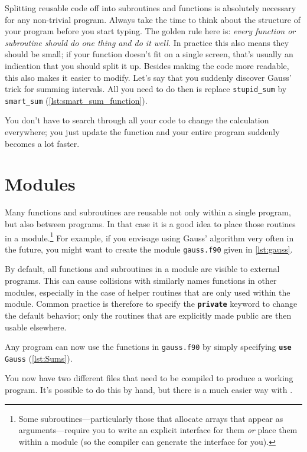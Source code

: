 \documentclass[openany,oneside]{report}
\newcommand{\keyword}[1]{\texttt{\bfseries\color{DarkRed}#1}}
\begin{document}
Splitting reusable code off into subroutines and functions is absolutely necessary for any non-trivial program.
Always take the time to think about the structure of your program before you start typing.
The golden rule here is: \emph{every function or subroutine should do one thing and do it well.}
In practice this also means they should be small; if your function doesn't fit on a single screen, that's usually an indication that you should split it up.
Besides making the code more readable, this also makes it easier to modify.
Let's say that you suddenly discover Gauss' trick for summing intervals.
All you need to do then is replace \texttt{stupid\_sum} by \texttt{smart\_sum} (\autoref{lst:smart_sum_function}).

You don't have to search through all your code to change the calculation everywhere; you just update the function and your entire program suddenly becomes a lot faster.

\section{Modules}

Many functions and subroutines are reusable not only within a single program, but also between programs.
In that case it is a good idea to place those routines in a module.\footnote{Some subroutines---particularly those that allocate arrays that appear as arguments---require you to write an explicit interface for them \emph{or} place them within a module (so the compiler can generate the interface for you).}
For example, if you envisage using Gauss' algorithm very often in the future, you might want to create the module \texttt{gauss.f90} given in \autoref{lst:gauss}.

By default, all functions and subroutines in a module are visible to external programs.
This can cause collisions with similarly names functions in other modules, especially in the case of helper routines that are only used within the module.
Common practice is therefore to specify the \keyword{private} keyword to change the default behavior; only the routines that are explicitly made public are then usable elsewhere.

Any program can now use the functions in \texttt{gauss.f90} by simply specifying \texttt{\keyword{use} Gauss} (\autoref{lst:Sums}).

You now have two different files that need to be compiled to produce a working program.
It's possible to do this by hand, but there is a much easier way with .
\end{document}
